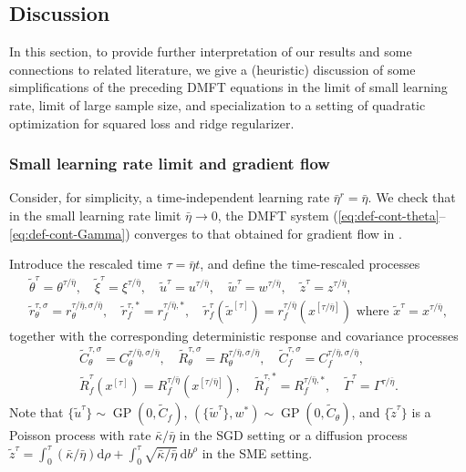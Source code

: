 \documentclass[11pt,letterpaper,reqno]{amsart}
\theoremstyle{definition}
\def\d{\mathrm{d}}
\def\GP{\operatorname{GP}}
\begin{document}
\subsection{Discussion}

In this section, to provide further interpretation of our results and some
connections to related literature, we give a (heuristic) discussion of some
simplifications of the preceding DMFT
equations in the limit of small learning rate, limit of large sample size,
and specialization to a setting of quadratic optimization for squared loss and
ridge regularizer.

\subsubsection{Small learning rate limit and gradient flow}\label{sec:comp-gf}

Consider, for simplicity, a time-independent learning rate
$\bar\eta^r=\bar\eta$.
We check that in the small learning rate limit $\bar\eta \to 0$,
the DMFT system (\ref{eq:def-cont-theta}--\ref{eq:def-cont-Gamma}) converges to
that obtained for gradient flow in \cite{celentano2021high}.

Introduce the rescaled time $\tau=\bar\eta t$,
and define the time-rescaled processes
\begin{equation}\label{eq:rescaled1}
\begin{gathered}
\tilde\theta^\tau=\theta^{\tau/\bar\eta},\quad
\tilde \xi^\tau=\xi^{\tau/\bar\eta},\quad
\tilde u^\tau = u^{\tau/\bar\eta},\quad
\tilde w^\tau=w^{\tau/\bar\eta},\quad
\tilde z^\tau=z^{\tau/\bar\eta},\\
\tilde r_\theta^{\tau,\sigma}=r_\theta^{\tau/\bar\eta,\sigma/\bar\eta},\quad
\tilde r_f^{\tau,*}=r_f^{\tau/\bar\eta,*},\quad
\tilde r_f^\tau(\tilde x^{[\tau]})=r_f^{\tau/\bar\eta}(x^{[\tau/\bar\eta]})
\text{ where } \tilde x^\tau=x^{\tau/\bar\eta},\end{gathered}
\end{equation}
together with the corresponding deterministic response and covariance processes
\begin{equation}\label{eq:rescaled2}
\begin{gathered}
\tilde C_\theta^{\tau,\sigma}=C_\theta^{\tau/\bar\eta,\sigma/\bar\eta}, \quad
\tilde R_\theta^{\tau,\sigma}=R_\theta^{\tau/\bar\eta,\sigma/\bar\eta}, \quad
\tilde C_f^{\tau,\sigma}=C_f^{\tau/\bar\eta,\sigma/\bar\eta},\\
\tilde R_f^{\tau}(x^{[\tau]})=R_f^{\tau/\bar\eta}(x^{[\tau/\bar\eta]}), \quad
\tilde R_f^{\tau,*}=R_f^{\tau/\bar\eta,*}, \quad
\tilde \Gamma^\tau=\Gamma^{\tau/\bar\eta}.\end{gathered}
\end{equation}
Note that $\{\tilde u^\tau\} \sim \GP(0,\tilde C_f)$,
$(\{\tilde w^\tau\},w^*) \sim \GP(0,\tilde C_\theta)$, and $\{\tilde z^\tau\}$
is a Poisson process with rate $\bar\kappa/\bar\eta$ in the SGD setting or a
diffusion process $\tilde z^\tau=\int_0^\tau (\bar\kappa/\bar\eta)\d \rho
+\int_0^\tau \sqrt{\bar\kappa/\bar\eta}\,\d b^\rho$ in the SME setting.
\end{document}
